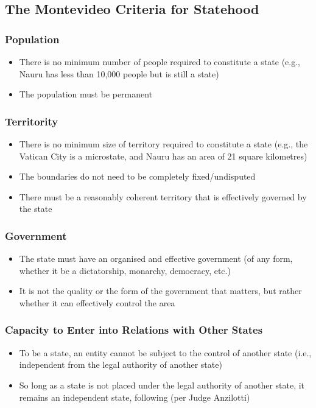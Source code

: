 \subsection{The Montevideo Criteria for Statehood}
\subsubsection{Population}
\begin{itemize}
    \item There is no minimum number of people required to constitute a state (e.g., Nauru has less than 10,000 people but is still a state)
    \item The population must be permanent
\end{itemize}

\subsubsection{Territority}
\begin{itemize}
    \item There is no minimum size of territory required to constitute a state (e.g., the Vatican City is a microstate, and Nauru has an area of 21 square kilometres)
    \item The boundaries do not need to be completely fixed/undisputed
    \item There must be a reasonably coherent territory that is effectively governed by the state
\end{itemize}

\subsubsection{Government}
\begin{itemize}
    \item The state must have an organised and effective government (of any form, whether it be a dictatorship, monarchy, democracy, etc.)
    \item It is not the quality or the form of the government that matters, but rather whether it can effectively control the area
\end{itemize}

\subsubsection{Capacity to Enter into Relations with Other States}
\begin{itemize}
    \item To be a state, an entity cannot be subject to the control of another state (i.e., independent from the legal authority of another state)
    \item So long as a state is not placed under the legal authority of another state, it remains an independent state, following  (per Judge Anzilotti)
\end{itemize}

